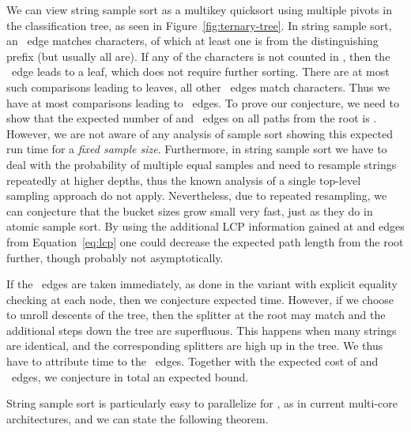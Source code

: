 \documentclass[a4paper]{myjournal}
\begin{document}
We can view string sample sort as a multikey quicksort using multiple pivots in
the classification tree, as seen in Figure~\ref{fig:ternary-tree}.  In string
sample sort, an ~edge matches  characters, of which at least one is from
the distinguishing prefix  (but usually all are). If any of the 
characters is not counted in , then the ~edge leads to a leaf, which does
not require further sorting. There are at most  such comparisons leading to
leaves, all other ~edges match  characters. Thus we have at most
 comparisons leading to ~edges.  To prove our conjecture, we
need to show that the expected number of  and ~edges on all paths from the
root is .  However, we are not aware of any analysis of sample sort
showing this expected run time for a \emph{fixed sample size}. Furthermore, in
string sample sort we have to deal with the probability of multiple equal
samples and need to resample strings repeatedly at higher depths, thus the known
analysis of a single top-level sampling approach
\cite{blelloch1991comparison,yang1987optimal,frazer1970samplesort} do not
apply. Nevertheless, due to repeated resampling, we can conjecture that the
bucket sizes grow small very fast, just as they do in atomic sample sort.  By
using the additional LCP information gained at  and  edges from
Equation~\ref{eq:lcp} one could decrease the expected path length from the root
further, though probably not asymptotically.

If the ~edges are taken immediately, as done in the variant with explicit
equality checking at each node, then we conjecture expected  time.  However, if we choose to unroll descents of the tree, then the
splitter at the root may match and the  additional steps down the
tree are superfluous.  This happens when many strings are identical, and the
corresponding splitters are high up in the tree. We thus have to attribute
 time to the ~edges. Together with the
expected cost of  and ~edges, we conjecture in total an expected
 bound.

String sample sort is particularly easy to parallelize for , as in
current multi-core architectures, and we can state the following theorem.
\end{document}
